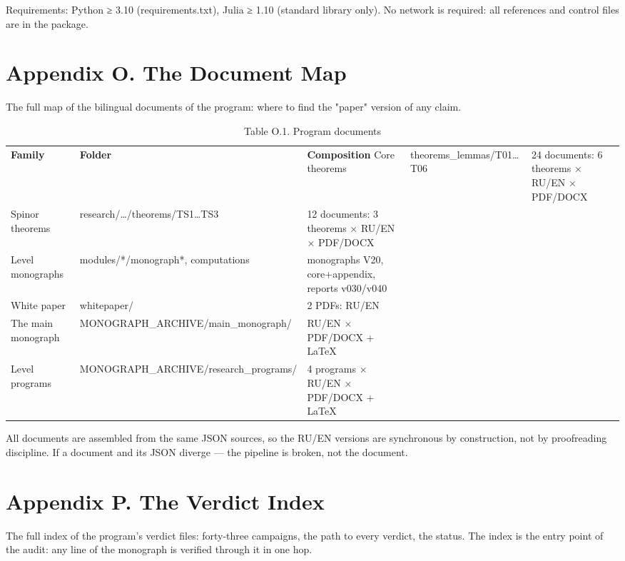 \documentclass[11pt,a4paper]{article}
\begin{document}
Requirements: Python ≥ 3.10 (requirements.txt), Julia ≥ 1.10 (standard library only). No network is required: all references and control files are in the package.

\section{Appendix O. The Document Map}

The full map of the bilingual documents of the program: where to find the "paper" version of any claim.

\begin{table}[htbp]\centering\small
\caption{Table O.1. Program documents}
\begin{tabular}{p{} p{} p{}}
\toprule
\textbf{Family} & \textbf{Folder} & \textbf{Composition}
\midrule
Core theorems & theorems\_lemmas/T01…T06 & 24 documents: 6 theorems × RU/EN × PDF/DOCX \\
Spinor theorems & research/…/theorems/TS1…TS3 & 12 documents: 3 theorems × RU/EN × PDF/DOCX \\
Level monographs & modules/*/monograph*, computations & monographs V20, core+appendix, reports v030/v040 \\
White paper & whitepaper/ & 2 PDFs: RU/EN \\
The main monograph & MONOGRAPH\_ARCHIVE/main\_monograph/ & RU/EN × PDF/DOCX + LaTeX \\
Level programs & MONOGRAPH\_ARCHIVE/research\_programs/ & 4 programs × RU/EN × PDF/DOCX + LaTeX \\
\bottomrule
\end{tabular}
\end{table}

All documents are assembled from the same JSON sources, so the RU/EN versions are synchronous by construction, not by proofreading discipline. If a document and its JSON diverge — the pipeline is broken, not the document.

\section{Appendix P. The Verdict Index}

The full index of the program's verdict files: forty-three campaigns, the path to every verdict, the status. The index is the entry point of the audit: any line of the monograph is verified through it in one hop.
\end{document}

